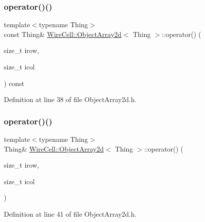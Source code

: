 \subsubsection{\texorpdfstring{operator()()}{operator()()}\hspace{0.1cm}{\footnotesize\ttfamily [1/2]}}
{\footnotesize\ttfamily template$<$typename Thing$>$ \\
const Thing\& \hyperlink{class_wire_cell_1_1_object_array2d}{Wire\+Cell\+::\+Object\+Array2d}$<$ Thing $>$\+::operator() (\begin{DoxyParamCaption}\item[{size\+\_\+t}]{irow,  }\item[{size\+\_\+t}]{icol }\end{DoxyParamCaption}) const\hspace{0.3cm}{\ttfamily [inline]}}



Definition at line 38 of file Object\+Array2d.\+h.

\mbox{\label{class_wire_cell_1_1_object_array2d_a375dbad99a4487e7a535d118f24131e8}} 
\subsubsection{\texorpdfstring{operator()()}{operator()()}\hspace{0.1cm}{\footnotesize\ttfamily [2/2]}}
{\footnotesize\ttfamily template$<$typename Thing$>$ \\
Thing\& \hyperlink{class_wire_cell_1_1_object_array2d}{Wire\+Cell\+::\+Object\+Array2d}$<$ Thing $>$\+::operator() (\begin{DoxyParamCaption}\item[{size\+\_\+t}]{irow,  }\item[{size\+\_\+t}]{icol }\end{DoxyParamCaption})\hspace{0.3cm}{\ttfamily [inline]}}



Definition at line 41 of file Object\+Array2d.\+h.

\mbox{\label{class_wire_cell_1_1_object_array2d_a72e321e7877dea606a36cb07816cfa84}} 
